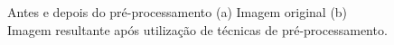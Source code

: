 \begin{figure}[!htb]
\centering
    \caption{\label{fig:prep} Antes e depois do pré-processamento (a) Imagem original (b) Imagem resultante após utilização de técnicas de pré-processamento.}

\end{figure}
